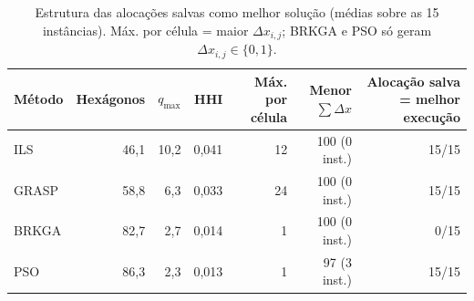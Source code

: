 \begin{table}[t]
\centering
\caption{Estrutura das alocações salvas como melhor solução (médias sobre as 15 instâncias). Máx. por célula = maior $\Delta x_{i,j}$; BRKGA e PSO só geram $\Delta x_{i,j}\in\{0,1\}$.}
\label{tab:structure}
\footnotesize
\begin{tabular}{@{}lrrrrrr@{}}
\toprule
Método & Hexágonos & $q_{\max}$ & HHI & Máx. por célula & Menor $\sum\Delta x$ & Alocação salva = melhor execução \\
\midrule
ILS & 46,1 & 10,2 & 0,041 & 12 & 100 (0 inst.) & 15/15 \\
GRASP & 58,8 & 6,3 & 0,033 & 24 & 100 (0 inst.) & 15/15 \\
BRKGA & 82,7 & 2,7 & 0,014 & 1 & 100 (0 inst.) & 0/15 \\
PSO & 86,3 & 2,3 & 0,013 & 1 & 97 (3 inst.) & 15/15 \\
\bottomrule
\end{tabular}
\end{table}
